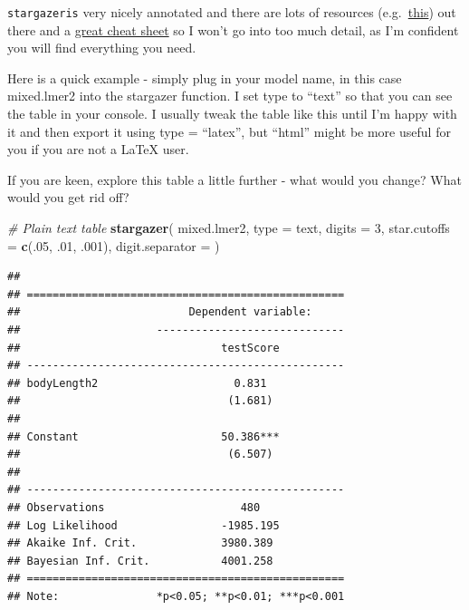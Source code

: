 \documentclass[
]{article}
\newenvironment{Shaded}{\begin{snugshade}}{\end{snugshade}}
\newcommand{\AttributeTok}[1]{\textcolor[rgb]{0.13,0.29,0.53}{#1}}
\newcommand{\CommentTok}[1]{\textcolor[rgb]{0.56,0.35,0.01}{\textit{#1}}}
\newcommand{\DecValTok}[1]{\textcolor[rgb]{0.00,0.00,0.81}{#1}}
\newcommand{\FunctionTok}[1]{\textcolor[rgb]{0.13,0.29,0.53}{\textbf{#1}}}
\newcommand{\NormalTok}[1]{#1}
\newcommand{\StringTok}[1]{\textcolor[rgb]{0.31,0.60,0.02}{#1}}
\begin{document}
\texttt{stargazeris} very nicely annotated and there are lots of
resources
(e.g.~\href{https://cran.r-project.org/web/packages/stargazer/vignettes/stargazer.pdf}{this})
out there and a
\href{http://jakeruss.com/cheatsheets/stargazer.html}{great cheat sheet}
so I won't go into too much detail, as I'm confident you will find
everything you need.

Here is a quick example - simply plug in your model name, in this case
mixed.lmer2 into the stargazer function. I set type to ``text'' so that
you can see the table in your console. I usually tweak the table like
this until I'm happy with it and then export it using type = ``latex'',
but ``html'' might be more useful for you if you are not a LaTeX user.

If you are keen, explore this table a little further - what would you
change? What would you get rid off?

\begin{Shaded}
\begin{Highlighting}[]
\CommentTok{\# Plain text table}
\FunctionTok{stargazer}\NormalTok{(}
\NormalTok{  mixed.lmer2,}
  \AttributeTok{type =} \StringTok{\textquotesingle{}text\textquotesingle{}}\NormalTok{,}
  \AttributeTok{digits =} \DecValTok{3}\NormalTok{,}
  \AttributeTok{star.cutoffs =} \FunctionTok{c}\NormalTok{(.}\DecValTok{05}\NormalTok{, .}\DecValTok{01}\NormalTok{, .}\DecValTok{001}\NormalTok{),}
  \AttributeTok{digit.separator =} \StringTok{\textquotesingle{}\textquotesingle{}}
\NormalTok{)}
\end{Highlighting}
\end{Shaded}

\begin{verbatim}
## 
## =================================================
##                          Dependent variable:     
##                     -----------------------------
##                               testScore          
## -------------------------------------------------
## bodyLength2                     0.831            
##                                (1.681)           
##                                                  
## Constant                      50.386***          
##                                (6.507)           
##                                                  
## -------------------------------------------------
## Observations                     480             
## Log Likelihood                -1985.195          
## Akaike Inf. Crit.             3980.389           
## Bayesian Inf. Crit.           4001.258           
## =================================================
## Note:               *p<0.05; **p<0.01; ***p<0.001
\end{verbatim}
\end{document}
